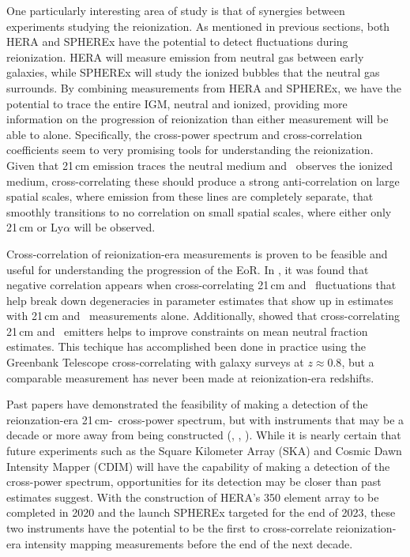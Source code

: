 One particularly interesting area of study is that of synergies between experiments
studying the reionization. As mentioned in previous sections, both HERA and SPHEREx
have the potential to
detect fluctuations during reionization. HERA will measure emission from neutral gas
between early galaxies, while SPHEREx will study the ionized bubbles that the
neutral gas surrounds. By combining measurements from HERA and SPHEREx, we have
the potential to trace the entire IGM, neutral and ionized, providing more
information on the progression of reionization than either measurement will
be able to alone. Specifically, the cross-power spectrum and cross-correlation
coefficients seem to very promising tools for understanding the reionization.
Given that 21\,cm emission traces the neutral medium and \lya\ observes the ionized
medium, cross-correlating these should produce a strong anti-correlation on large
spatial scales, where emission from these lines are completely separate, that smoothly transitions
to no correlation on small spatial scales, where either only 21\,cm or Ly$\alpha$
will be observed.

Cross-correlation of reionization-era measurements is proven to be feasible and
useful for understanding the progression of the EoR. In \cite{2017ApJ...836..176H},
it was found that negative correlation appears when cross-correlating 21\,cm and
\lya\ fluctuations that help break down degeneracies in parameter estimates that
show up in estimates with 21\,cm and \lya\ measurements alone. Additionally, \cite{2016MNRAS.459.2741S}
showed that cross-correlating 21\,cm and \lya\ emitters helps to improve constraints
on mean neutral fraction estimates. This techique has accomplished been done in practice using the
Greenbank Telescope cross-correlating with galaxy surveys at $z \approx 0.8$, but
a comparable measurement has never been made at reionization-era redshifts.

Past papers have demonstrated the feasibility of making a detection
of the reionzation-era 21\,cm-\lya\ cross-power spectrum, but with instruments that may be a decade or more away
from being constructed (\cite{2017ApJ...836..176H}, \cite{2017ApJ...848...52H}, \cite{2018MNRAS.479.2754K}).
While it is nearly certain that future experiments such as the Square Kilometer Array (SKA) and Cosmic Dawn Intensity
Mapper (CDIM) will have the capability of making a detection of the cross-power spectrum,
opportunities for its detection may be closer than past estimates suggest.
With the construction of HERA's 350 element array to be completed in 2020 and
the launch SPHEREx targeted for the end of 2023, these two
instruments have the potential to be the first to cross-correlate reionization-era intensity
mapping measurements before the end of the next decade.

